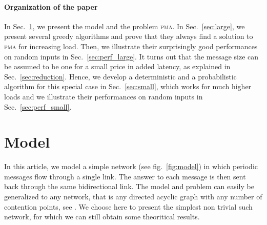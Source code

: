 \documentclass[10pt, conference, letterpaper]{IEEEtran}
\newcommand\pma{\textsc{pma}\xspace}
\begin{document}
\paragraph{Organization of the paper}

In Sec.~\ref{sec:model}, we present the model and the problem \pma. In Sec.~\ref{sec:large},
we present several greedy algorithms and prove that they always find a solution to \pma for increasing load. Then, we illustrate their surprisingly good performances on random inputs in Sec.~\ref{sec:perf_large}. It turns out that the message size can be assumed to be one for a small price in added latency, as explained in Sec.~\ref{sec:reduction}. Hence, we develop a deterministic and a probabilistic algorithm for this special case in Sec.~\ref{sec:small}, which works for much higher loads and we illustrate their performances on random inputs in Sec.~\ref{sec:perf_small}.


\section{Model}\label{sec:model}


In this article, we model a simple network (see fig.~\ref{fig:model}) in which periodic messages flow through a single link. The answer to each message is then sent back through the same bidirectional link. The model and problem can easily be generalized to any network, that is any directed acyclic graph with any number of contention points, see \cite{dominique2018deterministic}. We choose here to present the simplest non trivial such network, for which we can still obtain some theoritical results. 
\end{document}
